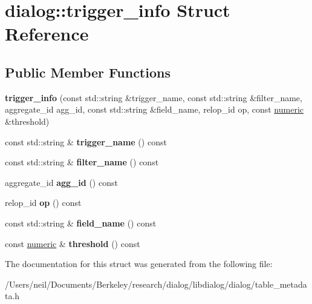\hypertarget{structdialog_1_1trigger__info}{}\section{dialog\+:\+:trigger\+\_\+info Struct Reference}
\label{structdialog_1_1trigger__info}
\subsection*{Public Member Functions}
\begin{DoxyCompactItemize}
\item 
\mbox{\label{structdialog_1_1trigger__info_acd6fb53454c63a2203b558be1c7bd4fa}} 
{\bfseries trigger\+\_\+info} (const std\+::string \&trigger\+\_\+name, const std\+::string \&filter\+\_\+name, aggregate\+\_\+id agg\+\_\+id, const std\+::string \&field\+\_\+name, relop\+\_\+id op, const \hyperlink{classdialog_1_1numeric}{numeric} \&threshold)
\item 
\mbox{\label{structdialog_1_1trigger__info_a3ac73c8c9986a395a1c4a247b5bc8af4}} 
const std\+::string \& {\bfseries trigger\+\_\+name} () const
\item 
\mbox{\label{structdialog_1_1trigger__info_a6b66660e86e8217ad842cd719ab1391f}} 
const std\+::string \& {\bfseries filter\+\_\+name} () const
\item 
\mbox{\label{structdialog_1_1trigger__info_a3b44b2fcd5484841ca1d902810b39342}} 
aggregate\+\_\+id {\bfseries agg\+\_\+id} () const
\item 
\mbox{\label{structdialog_1_1trigger__info_add236537768fe1cce28bf8a7204592f6}} 
relop\+\_\+id {\bfseries op} () const
\item 
\mbox{\label{structdialog_1_1trigger__info_a3c414f4881add3e4da377028c212ef47}} 
const std\+::string \& {\bfseries field\+\_\+name} () const
\item 
\mbox{\label{structdialog_1_1trigger__info_a79d7e14277aee7105aa8faf983e0a601}} 
const \hyperlink{classdialog_1_1numeric}{numeric} \& {\bfseries threshold} () const
\end{DoxyCompactItemize}


The documentation for this struct was generated from the following file\+:\begin{DoxyCompactItemize}
\item 
/\+Users/neil/\+Documents/\+Berkeley/research/dialog/libdialog/dialog/table\+\_\+metadata.\+h\end{DoxyCompactItemize}

